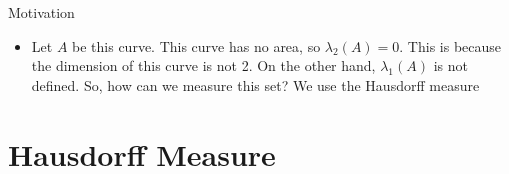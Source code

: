 \documentclass{beamer}
\DeclareMathOperator{\diam}{diam}
\begin{document}
\begin{frame}{Motivation}
\begin{center}
\end{center}
\begin{itemize}
    \item Let $A$ be this curve. This curve has no area, so $\lambda_2(A)= 0$. This is because the dimension of this curve is not 2. On the other hand, $\lambda _1(A)$ is not defined. So, how can we measure this set? We use the Hausdorff measure
\end{itemize}
\end{frame}

\section{Hausdorff Measure}

\end{document}
